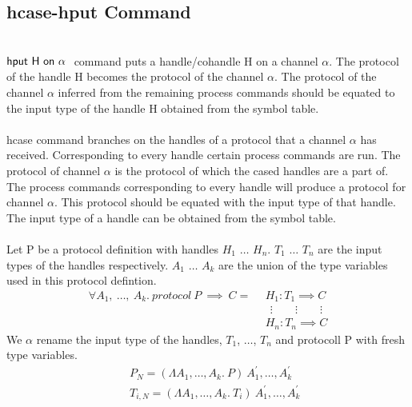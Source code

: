 \documentclass[11pt]{article}
\newcommand{\hput}{\ensuremath{{\sf hput ~ H ~ on ~\alpha~}}\xspace}
\begin{document}
\subsection {hcase-hput Command}
~~\\
$\hput$ command puts a handle/cohandle H on a channel $\alpha$. The protocol of the handle H becomes the protocol of the channel $\alpha$. The protocol of the channel $\alpha$ inferred from the remaining process commands should be equated to the input type of the handle H obtained from the symbol table. 
~~\\~~\\
{\sf hcase} command branches on the handles of a protocol that a channel $\alpha$ has received. Corresponding to every handle certain process commands are run. The protocol of channel $\alpha$ is the protocol of which the cased handles are a part of. The process commands corresponding to every handle will produce a protocol for channel $\alpha$. This protocol should be equated with the input type of that handle. The input type of a handle can be obtained from the symbol table. 
~~\\~~\\
Let P be  a protocol definition with handles $H_1$ $\ldots$ $H_n$. $T_1$ $\ldots$ $T_n$ are the input types of the handles respectively. $A_1$ $\ldots$ $A_k$ are the union of the type variables used in this protocol defintion.
\begin{align*} 
\forall A_1,~ \ldots,~A_k.~protocol~ P ~\implies~ C =
 & ~~ H_1 : T_{1} \implies C \\
 & ~~~~ \vdots \qquad \vdots \qquad \vdots \\ 
 & ~~ H_n : T_{n} \implies C 
\end{align*}
We $\alpha$ rename the input type of the handles, $T_1$, $\ldots$, $T_n$ and protocoll P with fresh type variables.
\begin{align*} 
 & ~~ P_N = (\Lambda A_1,\ldots,A_k.~P)~A_1^{\prime},\ldots,A_k^{\prime} \\
 & ~~ T_{i,N} = (\Lambda A_1,\ldots,A_k.~ T_{i})~A_1^{\prime},\ldots,A_k^{\prime} \\
\end{align*}
\end{document}
